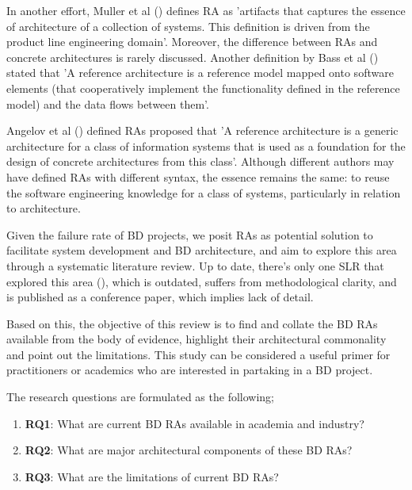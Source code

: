 \documentclass[review]{elsarticle}
\begin{document}
In another effort, Muller et al (\cite{muller2008reference}) defines RA as 'artifacts that captures the essence of architecture of a collection of systems. This definition is driven from the product line engineering domain'. Moreover, the difference between RAs and concrete architectures is rarely discussed. Another definition by Bass et al (\cite{Bass}) stated that 'A reference architecture is a reference model mapped onto software elements (that cooperatively implement the functionality defined in the reference model) and the data flows between them'. 

Angelov et al (\cite{angelov2009classification}) defined RAs proposed that 'A reference architecture is a generic architecture for a class of information systems that is used as a foundation for the design of concrete architectures from this class'. Although different authors may have defined RAs with different syntax, the essence remains the same: to reuse the software engineering knowledge for a class of systems, particularly in relation to architecture. 

Given the failure rate of BD projects, we posit RAs as potential solution to facilitate system development and BD architecture, and aim to explore this area through a systematic literature review. Up to date, there's only one SLR that explored this area (\cite{AtaeiACIS}), which is outdated, suffers from methodological clarity, and is published as a conference paper, which implies lack of detail.

Based on this, the objective of this review is to find and collate the BD RAs available from the body of evidence, highlight their architectural commonality and point out the limitations. This study can be considered a useful primer for practitioners or academics who are interested in partaking in a BD project. 

The research questions are formulated as the following; 
\begin{enumerate}
    \item \textbf{RQ1}: What are current BD RAs available in academia and industry?
    \item \textbf{RQ2}: What are major architectural components of these BD RAs? 
    \item \textbf{RQ3}: What are the limitations of current BD RAs?
\end{enumerate}
\end{document}
